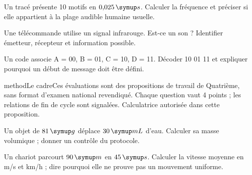 \par\noindent\begin{minipage}{\linewidth}
Un tracé présente 10 motifs en $0{,}025\unite s$. Calculer la fréquence et préciser si elle appartient à la plage audible humaine usuelle.\par
{}
\end{minipage}\par
\par\noindent\begin{minipage}{\linewidth}
Une télécommande utilise un signal infrarouge. Est-ce un son ? Identifier émetteur, récepteur et information possible.\par
\end{minipage}\par
\par\noindent\begin{minipage}{\linewidth}
Un code associe A = 00, B = 01, C = 10, D = 11. Décoder 10 01 11 et expliquer pourquoi un début de message doit être défini.\par
\end{minipage}\par
{}\pcGrilleCourte{}
\label{evaluations}
\begin{pcEncadre}{method}{Le cadre}Ces évaluations sont des propositions de travail de Quatrième, sans format d’examen national revendiqué. Chaque question vaut 4 points ; les relations de fin de cycle sont signalées. Calculatrice autorisée dans cette proposition.\end{pcEncadre}
\label{sujet-E1}
\par\noindent\begin{minipage}{\linewidth}
Un objet de $81\unite g$ déplace $30\unite{mL}$ d’eau. Calculer sa masse volumique ; donner un contrôle du protocole.\par
\end{minipage}\par
\par\noindent\begin{minipage}{\linewidth}
Un chariot parcourt $90\unite m$ en $45\unite s$. Calculer la vitesse moyenne en m/s et km/h ; dire pourquoi elle ne prouve pas un mouvement uniforme.\par
\end{minipage}\par
